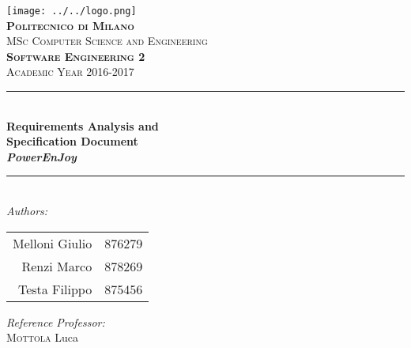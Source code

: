 \begin{titlepage}

\newcommand{\HRule}{\rule{\linewidth}{0.3mm}} %

 \vspace*{0.3cm}
 
\center %

\texttt{[image: ../../logo.png]}\\[0.4cm] 

\textsc{\Large \textbf{Politecnico di Milano}\\MSc Computer Science and Engineering}\\[1.7cm] \textsc{\Large \textbf{Software Engineering 2}\\[0.1cm]Academic Year 2016-2017}\\[1cm] 


\HRule \\[0.4cm]
{ \huge \bfseries Requirements Analysis and\\Specification Document\\[0.5cm]\textit{PowerEnJoy}}\\[0.4cm] %
\HRule \\[1.5cm]
 
\Large \emph{Authors:}\\
\LARGE{
\begin{center}
\begin{tabular}{ r  l }
	Melloni Giulio & 876279\\
	Renzi Marco & 878269\\
	Testa Filippo & 875456 \\
\end{tabular}
\end{center}
}
\vspace*{0.8cm}
\Large{\emph{Reference Professor:} \\
{\textsc{Mottola} Luca} 
}


\end{titlepage}
